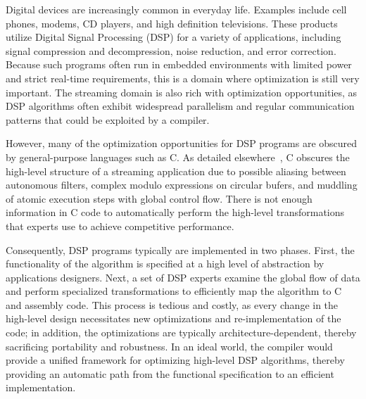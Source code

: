 

Digital devices are increasingly common in everyday life. Examples
include cell phones, modems, CD players, and high definition
televisions. These products utilize Digital Signal Processing (DSP)
for a variety of applications, including signal compression and
decompression, noise reduction, and error correction.  Because such
programs often run in embedded environments with limited power and
strict real-time requirements, this is a domain where optimization is
still very important.  The streaming domain is also rich with
optimization opportunities, as DSP algorithms often exhibit widespread
parallelism and regular communication patterns that could be exploited
by a compiler.

However, many of the optimization opportunities for DSP programs are
obscured by general-purpose languages such as C.  As detailed
elsewhere~\cite{streamitcc}, C obscures the high-level structure of a
streaming application due to possible aliasing between autonomous
filters, complex modulo expressions on circular bufers, and muddling
of atomic execution steps with global control flow.  There is not
enough information in C code to automatically perform the high-level
transformations that experts use to achieve competitive performance.

Consequently, DSP programs typically are implemented in two phases.
First, the functionality of the algorithm is specified at a high level
of abstraction by applications designers.  Next, a set of DSP experts
examine the global flow of data and perform specialized
transformations to efficiently map the algorithm to C and assembly
code.  This process is tedious and costly, as every change in the
high-level design necessitates new optimizations and re-implementation
of the code; in addition, the optimizations are typically
architecture-dependent, thereby sacrificing portability and
robustness.  In an ideal world, the compiler would provide a unified
framework for optimizing high-level DSP algorithms, thereby providing
an automatic path from the functional specification to an efficient
implementation.

